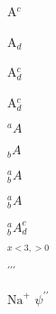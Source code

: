 \documentclass{article}
\begin{document}
A$^c$

A$_d$

A$^c_d$

A$_d^c$


$^aA$

$_bA$

$^a_bA$

$_b^aA$

$_b^aA^c_d$

$_{x<3,>0}$

$^{\prime\prime\prime}$


$\mathrm{Na}^+$ 
$\psi^{\prime\prime}$
\end{document}
